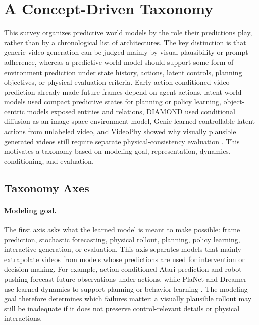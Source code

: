\section{A Concept-Driven Taxonomy}
\label{sec:taxonomy}

This survey organizes predictive world models by the role their predictions play, rather than by a chronological list of architectures. The key distinction is that generic video generation can be judged mainly by visual plausibility or prompt adherence, whereas a predictive world model should support some form of environment prediction under state history, actions, latent controls, planning objectives, or physical-evaluation criteria. Early action-conditioned video prediction already made future frames depend on agent actions, latent world models used compact predictive states for planning or policy learning, object-centric models exposed entities and relations, DIAMOND used conditional diffusion as an image-space environment model, Genie learned controllable latent actions from unlabeled video, and VideoPhy showed why visually plausible generated videos still require separate physical-consistency evaluation \cite{oh2015_action_conditional_video_prediction_prov,hafner2019_planet_prov,hafner2020_dreamer_prov,battaglia2016_interaction_networks_prov,watters2017_visual_interaction_networks_prov,janner2019_o2p2_prov,alonso2024_diamond_prov,bruce2024_genie_prov,bansal2025_videophy_prov}. This motivates a taxonomy based on modeling goal, representation, dynamics, conditioning, and evaluation.

\subsection{Taxonomy Axes}

\paragraph{Modeling goal.}
The first axis asks what the learned model is meant to make possible: frame prediction, stochastic forecasting, physical rollout, planning, policy learning, interactive generation, or evaluation. This axis separates models that mainly extrapolate videos from models whose predictions are used for intervention or decision making. For example, action-conditioned Atari prediction and robot pushing forecast future observations under actions, while PlaNet and Dreamer use learned dynamics to support planning or behavior learning \cite{oh2015_action_conditional_video_prediction_prov,finn2016_physical_interaction_video_prediction_prov,hafner2019_planet_prov,hafner2020_dreamer_prov}. The modeling goal therefore determines which failures matter: a visually plausible rollout may still be inadequate if it does not preserve control-relevant details or physical interactions.

